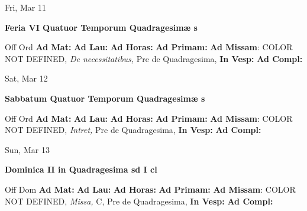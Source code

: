 \documentclass[10pt]{book}
\begin{document}
\begin{center}
\begin{minipage}{3.5in}
\vspace{2em}
\begin{center}Fri, Mar 11
\end{center}
\textbf{ \large Feria VI Quatuor Temporum Quadragesimæ
\textnormal{\normalsize s}}

\begin{justify}Off Ord
\textbf{Ad Mat: }
\textbf{Ad Lau: }
\textbf{Ad Horas: }
\textbf{Ad Primam: }\textbf{Ad Missam}: COLOR NOT DEFINED, \textit{De necessitatibus,} Pre de Quadragesima, 
\textbf{In Vesp: }
\textbf{Ad Compl: }
\end{justify}
\end{minipage}
\end{center}

\begin{center}
\begin{minipage}{3.5in}
\vspace{2em}
\begin{center}Sat, Mar 12
\end{center}
\textbf{ \large Sabbatum Quatuor Temporum Quadragesimæ
\textnormal{\normalsize s}}

\begin{justify}Off Ord
\textbf{Ad Mat: }
\textbf{Ad Lau: }
\textbf{Ad Horas: }
\textbf{Ad Primam: }\textbf{Ad Missam}: COLOR NOT DEFINED, \textit{Intret,} Pre de Quadragesima, 
\textbf{In Vesp: }
\textbf{Ad Compl: }
\end{justify}
\end{minipage}
\end{center}

\begin{center}
\begin{minipage}{3.5in}
\vspace{2em}
\begin{center}Sun, Mar 13
\end{center}
\textbf{ \large Dominica II in Quadragesima
\textnormal{\normalsize sd I cl}}

\begin{justify}Off Dom
\textbf{Ad Mat: }
\textbf{Ad Lau: }
\textbf{Ad Horas: }
\textbf{Ad Primam: }\textbf{Ad Missam}: COLOR NOT DEFINED, \textit{Missa,} C, Pre de Quadragesima, 
\textbf{In Vesp: }
\textbf{Ad Compl: }
\end{justify}
\end{minipage}
\end{center}
\end{document}
